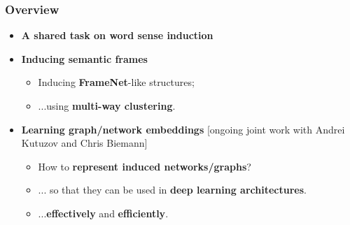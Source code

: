 \begin{frame}
  \frametitle{Overview}

  \begin{itemize}
  
  			\item \alert{\textbf{A shared task on word sense induction}} \cite{panchenko2018russe,arefyev2018russe}	
  		
  		\pause 	
  		\vspace{10pt}
  
		\item \alert{\textbf{Inducing semantic frames}} \cite{ustalov2018unsupervised} 
		\begin{itemize}
			\item Inducing \textbf{FrameNet}-like structures;
			\item ...using \textbf{multi-way clustering}.
		\end{itemize}
		
		\pause 
		\vspace{10pt} 
		
		\item \alert{\textbf{Learning graph/network embeddings}} [ongoing joint work with Andrei Kutuzov and Chris Biemann]
		\begin{itemize}
		\item How to \textbf{represent induced networks/graphs}?
		\item ... so that they can be used in \textbf{deep learning architectures}.
		\item ...\textbf{effectively} and \textbf{efficiently}.
		\end{itemize}
		
		 
				
	
			
\end{itemize}
	
\end{frame}



